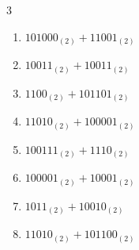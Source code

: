 \begin{multicols}{3}
\begin{enumerate}
  \item $101000_{(2)} + 11001_{(2)}$


  \item $10011_{(2)} + 10011_{(2)}$


  \item $1100_{(2)} + 101101_{(2)}$


  \item $11010_{(2)} + 100001_{(2)}$


  \item $100111_{(2)} + 1110_{(2)}$


  \item $100001_{(2)} + 10001_{(2)}$


  \item $1011_{(2)} + 10010_{(2)}$


  \item $11010_{(2)} + 101100_{(2)}$


\end{enumerate}
\end{multicols}

\newpage
\resetdrill

